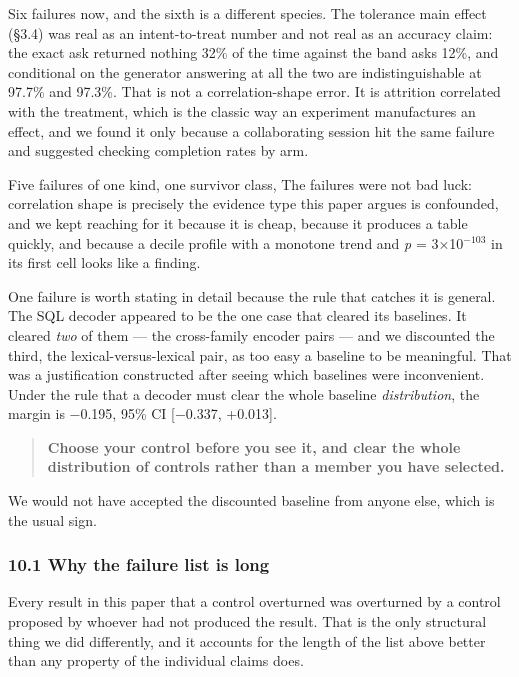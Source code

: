 \documentclass[
  10pt,
]{article}
\theoremstyle{plain}
\theoremstyle{definition}
\begin{document}
Six failures now, and the sixth is a different species. The tolerance
main effect (§3.4) was real as an intent-to-treat number and not real as
an accuracy claim: the exact ask returned nothing 32\% of the time
against the band ask\textquotesingle s 12\%, and conditional on the
generator answering at all the two are indistinguishable at 97.7\% and
97.3\%. That is not a correlation-shape error. It is attrition
correlated with the treatment, which is the classic way an experiment
manufactures an effect, and we found it only because a collaborating
session hit the same failure and suggested checking completion rates by
arm.

Five failures of one kind, one survivor class, The failures were not bad
luck: correlation shape is precisely the evidence type this paper argues
is confounded, and we kept reaching for it because it is cheap, because
it produces a table quickly, and because a decile profile with a
monotone trend and \emph{p} = 3×10\(^{-103}\) in its first cell looks
like a finding.

One failure is worth stating in detail because the rule that catches it
is general. The SQL decoder appeared to be the one case that cleared its
baselines. It cleared \emph{two} of them --- the cross-family encoder
pairs --- and we discounted the third, the lexical-versus-lexical pair,
as too easy a baseline to be meaningful. That was a justification
constructed after seeing which baselines were inconvenient. Under the
rule that a decoder must clear the whole baseline \emph{distribution},
the margin is −0.195, 95\% CI {[}−0.337, +0.013{]}.

\begin{quote}
\textbf{Choose your control before you see it, and clear the whole
distribution of controls rather than a member you have selected.}
\end{quote}

We would not have accepted the discounted baseline from anyone else,
which is the usual sign.

\subsubsection{10.1 Why the failure list is
long}\label{101-why-the-failure-list-is-long}

Every result in this paper that a control overturned was overturned by a
control proposed by whoever had not produced the result. That is the
only structural thing we did differently, and it accounts for the length
of the list above better than any property of the individual claims
does.
\end{document}
